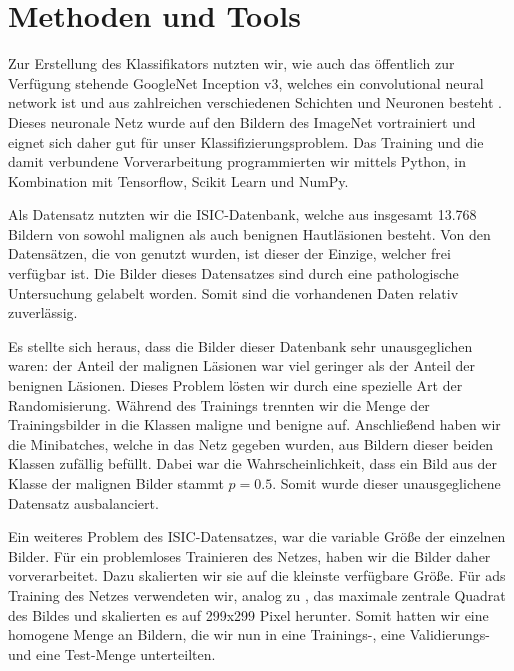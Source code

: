 \section{Methoden und Tools}

Zur Erstellung des Klassifikators nutzten wir, wie \citet{esteva2017dermatologist} auch das öffentlich zur Verfügung stehende GoogleNet Inception v3, welches ein convolutional neural network ist und aus zahlreichen verschiedenen Schichten und Neuronen besteht \citep{szegedy2016rethinking} . Dieses neuronale Netz wurde auf den Bildern des ImageNet vortrainiert \citep{russakovsky2015imagenet} und eignet sich daher gut für unser Klassifizierungsproblem.  Das Training und die damit verbundene Vorverarbeitung programmierten wir mittels Python, in Kombination mit Tensorflow, Scikit Learn und NumPy. 

Als Datensatz nutzten wir die ISIC-Datenbank, welche aus insgesamt 13.768 Bildern von sowohl malignen als auch benignen Hautläsionen besteht. Von den Datensätzen, die von \citep{esteva2017dermatologist} genutzt wurden, ist dieser der Einzige, welcher frei verfügbar ist. Die Bilder dieses Datensatzes sind durch eine pathologische Untersuchung gelabelt worden. Somit sind die vorhandenen Daten relativ zuverlässig.

Es stellte sich heraus, dass die Bilder dieser Datenbank sehr unausgeglichen waren: der Anteil der malignen Läsionen war viel geringer als der Anteil der benignen Läsionen. Dieses Problem lösten wir durch eine spezielle Art der Randomisierung. Während des Trainings trennten wir die Menge der Trainingsbilder in die Klassen maligne und benigne auf. Anschließend haben wir die Minibatches, welche in das Netz gegeben wurden, aus Bildern dieser beiden Klassen zufällig befüllt. Dabei war die Wahrscheinlichkeit, dass ein Bild aus der Klasse der malignen Bilder stammt $p=0.5$. Somit wurde dieser unausgeglichene Datensatz ausbalanciert.

Ein weiteres Problem des ISIC-Datensatzes, war die variable Größe der einzelnen Bilder. Für ein problemloses Trainieren des Netzes, haben wir die Bilder daher vorverarbeitet. Dazu skalierten wir sie auf die kleinste verfügbare Größe. Für ads Training des Netzes verwendeten wir, analog zu \citep{esteva2017dermatologist}, das maximale zentrale Quadrat des Bildes und skalierten es auf 299x299 Pixel herunter. Somit hatten wir eine homogene Menge an Bildern, die wir nun in eine Trainings-, eine Validierungs- und eine Test-Menge unterteilten.

